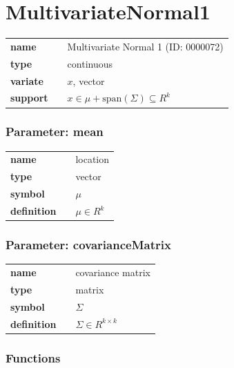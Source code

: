 \section*{MultivariateNormal1} 

  \bigskip 

\begin{tabular}{p{2cm}cl}
\textbf{name} & & Multivariate Normal 1 (ID: 0000072)\\ 
 
\textbf{type} & & continuous \\ 

\textbf{variate} & & $x$, vector \\ 

\textbf{support} & & $x \in \mu + \text{span}(\Sigma) \subseteq  R^k$
\end{tabular}


\subsubsection*{Parameter: mean}

\noindent\begin{tabular}{p{2cm}cl}
\textbf{name} & & location \\
\textbf{type} & & vector \\
\textbf{symbol} & & $\mu$  \\
\textbf{definition} & & $\mu \in R^k$
\end{tabular}
\subsubsection*{Parameter: covarianceMatrix}

\noindent\begin{tabular}{p{2cm}cl}
\textbf{name} & & covariance matrix \\
\textbf{type} & & matrix \\
\textbf{symbol} & & $\Sigma$  \\
\textbf{definition} & & $\Sigma \in R^{k\times k}$
\end{tabular}
\subsubsection*{Functions}

